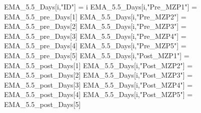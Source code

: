 \documentclass[12pt,twoside]{reedthesis}
\newenvironment{Shaded}{\begin{snugshade}}{\end{snugshade}}
\newcommand{\DecValTok}[1]{\textcolor[rgb]{0.00,0.00,0.81}{#1}}
\newcommand{\FloatTok}[1]{\textcolor[rgb]{0.00,0.00,0.81}{#1}}
\newcommand{\NormalTok}[1]{#1}
\newcommand{\StringTok}[1]{\textcolor[rgb]{0.31,0.60,0.02}{#1}}
\begin{document}
\begin{Shaded}
\begin{Highlighting}[]
\NormalTok{  EMA_}\FloatTok{5.5}\NormalTok{_Days[i,}\StringTok{"ID"}\NormalTok{] =}\StringTok{ }\NormalTok{i}
\NormalTok{  EMA_}\FloatTok{5.5}\NormalTok{_Days[i,}\StringTok{"Pre_MZP1"}\NormalTok{] =}\StringTok{ }\NormalTok{EMA_}\FloatTok{5.5}\NormalTok{_pre_Days[}\DecValTok{1}\NormalTok{]}
\NormalTok{  EMA_}\FloatTok{5.5}\NormalTok{_Days[i,}\StringTok{"Pre_MZP2"}\NormalTok{] =}\StringTok{ }\NormalTok{EMA_}\FloatTok{5.5}\NormalTok{_pre_Days[}\DecValTok{2}\NormalTok{]}
\NormalTok{  EMA_}\FloatTok{5.5}\NormalTok{_Days[i,}\StringTok{"Pre_MZP3"}\NormalTok{] =}\StringTok{ }\NormalTok{EMA_}\FloatTok{5.5}\NormalTok{_pre_Days[}\DecValTok{3}\NormalTok{]}
\NormalTok{  EMA_}\FloatTok{5.5}\NormalTok{_Days[i,}\StringTok{"Pre_MZP4"}\NormalTok{] =}\StringTok{ }\NormalTok{EMA_}\FloatTok{5.5}\NormalTok{_pre_Days[}\DecValTok{4}\NormalTok{]}
\NormalTok{  EMA_}\FloatTok{5.5}\NormalTok{_Days[i,}\StringTok{"Pre_MZP5"}\NormalTok{] =}\StringTok{ }\NormalTok{EMA_}\FloatTok{5.5}\NormalTok{_pre_Days[}\DecValTok{5}\NormalTok{]}
\NormalTok{  EMA_}\FloatTok{5.5}\NormalTok{_Days[i,}\StringTok{"Post_MZP1"}\NormalTok{] =}\StringTok{ }\NormalTok{EMA_}\FloatTok{5.5}\NormalTok{_post_Days[}\DecValTok{1}\NormalTok{]}
\NormalTok{  EMA_}\FloatTok{5.5}\NormalTok{_Days[i,}\StringTok{"Post_MZP2"}\NormalTok{] =}\StringTok{ }\NormalTok{EMA_}\FloatTok{5.5}\NormalTok{_post_Days[}\DecValTok{2}\NormalTok{]}
\NormalTok{  EMA_}\FloatTok{5.5}\NormalTok{_Days[i,}\StringTok{"Post_MZP3"}\NormalTok{] =}\StringTok{ }\NormalTok{EMA_}\FloatTok{5.5}\NormalTok{_post_Days[}\DecValTok{3}\NormalTok{]}
\NormalTok{  EMA_}\FloatTok{5.5}\NormalTok{_Days[i,}\StringTok{"Post_MZP4"}\NormalTok{] =}\StringTok{ }\NormalTok{EMA_}\FloatTok{5.5}\NormalTok{_post_Days[}\DecValTok{4}\NormalTok{]}
\NormalTok{  EMA_}\FloatTok{5.5}\NormalTok{_Days[i,}\StringTok{"Post_MZP5"}\NormalTok{] =}\StringTok{ }\NormalTok{EMA_}\FloatTok{5.5}\NormalTok{_post_Days[}\DecValTok{5}\NormalTok{]}
  

\end{Highlighting}
\end{Shaded}
\end{document}
